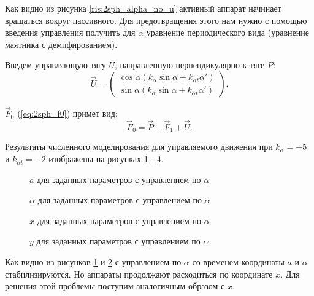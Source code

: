 Как видно из рисунка \ref{ris:2sph_alpha_no_u} активный аппарат начинает вращаться вокруг пассивного.
Для предотвращения этого нам нужно с помощью введения управления получить для $\alpha$ уравнение периодического вида (уравнение маятника с демпфированием).

Введем управляющую тягу $U$, направленную перпендикулярно к тяге $P$:
\begin{equation}
\label{ris:2sph_U_alpha}
	\vec{U} = 
	\begin{pmatrix}
		\cos \alpha \left(k_\alpha \sin \alpha + k_{\alpha t}\alpha'\right)\\
		\sin \alpha \left(k_\alpha \sin \alpha + k_{\alpha t}\alpha'\right)
	\end{pmatrix}.
\end{equation}

$\vec{F}_0$ (\ref{eq:2sph_f0}) примет вид:
\begin{equation}
\label{eq:2sph_f0_u}
	\vec{F}_0 = \vec{P} - \vec{F}_1 + \vec{U}.
\end{equation}

Результаты численного моделирования для управляемого движения при $k_\alpha = -5$ и $k_{\alpha t} = -2$ изображены на рисунках \ref{ris:2sph_a_alpha_u} - \ref{ris:2sph_y_alpha_u}.

\begin{figure}[H]
	\caption{$a$ для заданных параметров с управлением по $\alpha$}
	\label{ris:2sph_a_alpha_u}
\end{figure}
\begin{figure}[H]
	\caption{$\alpha$ для заданных параметров с управлением по $\alpha$}
	\label{ris:2sph_alpha_alpha_u}
\end{figure} 
\begin{figure}[H]
	\caption{$x$ для заданных параметров с управлением по $\alpha$}
	\label{ris:2sph_x_alpha_u}
\end{figure} 
\begin{figure}[H]
	\caption{$y$ для заданных параметров с управлением по $\alpha$}
	\label{ris:2sph_y_alpha_u}
\end{figure} 

Как видно из рисунков \ref{ris:2sph_a_alpha_u} и \ref{ris:2sph_alpha_alpha_u} с управлением по $\alpha$ со временем координаты $a$ и $\alpha$ стабилизируются.
Но аппараты продолжают расходиться по координате $x$.
Для решения этой проблемы поступим аналогичным образом с $x$.

